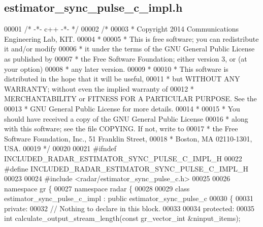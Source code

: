 \subsection{estimator\+\_\+sync\+\_\+pulse\+\_\+c\+\_\+impl.\+h}
\label{estimator__sync__pulse__c__impl_8h_source}

\begin{DoxyCode}
00001 \textcolor{comment}{/* -*- c++ -*- */}
00002 \textcolor{comment}{/* }
00003 \textcolor{comment}{ * Copyright 2014 Communications Engineering Lab, KIT.}
00004 \textcolor{comment}{ * }
00005 \textcolor{comment}{ * This is free software; you can redistribute it and/or modify}
00006 \textcolor{comment}{ * it under the terms of the GNU General Public License as published by}
00007 \textcolor{comment}{ * the Free Software Foundation; either version 3, or (at your option)}
00008 \textcolor{comment}{ * any later version.}
00009 \textcolor{comment}{ * }
00010 \textcolor{comment}{ * This software is distributed in the hope that it will be useful,}
00011 \textcolor{comment}{ * but WITHOUT ANY WARRANTY; without even the implied warranty of}
00012 \textcolor{comment}{ * MERCHANTABILITY or FITNESS FOR A PARTICULAR PURPOSE.  See the}
00013 \textcolor{comment}{ * GNU General Public License for more details.}
00014 \textcolor{comment}{ * }
00015 \textcolor{comment}{ * You should have received a copy of the GNU General Public License}
00016 \textcolor{comment}{ * along with this software; see the file COPYING.  If not, write to}
00017 \textcolor{comment}{ * the Free Software Foundation, Inc., 51 Franklin Street,}
00018 \textcolor{comment}{ * Boston, MA 02110-1301, USA.}
00019 \textcolor{comment}{ */}
00020 
00021 \textcolor{preprocessor}{#ifndef INCLUDED\_RADAR\_ESTIMATOR\_SYNC\_PULSE\_C\_IMPL\_H}
00022 \textcolor{preprocessor}{#define INCLUDED\_RADAR\_ESTIMATOR\_SYNC\_PULSE\_C\_IMPL\_H}
00023 
00024 \textcolor{preprocessor}{#include <radar/estimator_sync_pulse_c.h>}
00025 
00026 \textcolor{keyword}{namespace }gr \{
00027   \textcolor{keyword}{namespace }radar \{
00028 
00029     \textcolor{keyword}{class }estimator_sync_pulse_c_impl : \textcolor{keyword}{public} estimator_sync_pulse_c
00030     \{
00031      \textcolor{keyword}{private}:
00032       \textcolor{comment}{// Nothing to declare in this block.}
00033 
00034      \textcolor{keyword}{protected}:
00035       \textcolor{keywordtype}{int} calculate_output_stream_length(\textcolor{keyword}{const} gr\_vector\_int &ninput\_items);

\end{DoxyCode}
